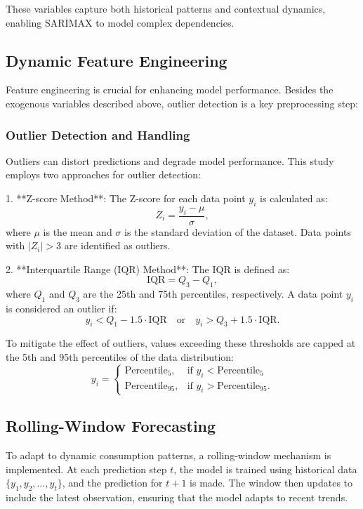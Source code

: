 \documentclass[conference]{IEEEtran}
\begin{document}
These variables capture both historical patterns and contextual dynamics, enabling SARIMAX to model complex dependencies.

\subsection{Dynamic Feature Engineering}

Feature engineering is crucial for enhancing model performance. Besides the exogenous variables described above, outlier detection is a key preprocessing step:

\subsubsection{Outlier Detection and Handling}
Outliers can distort predictions and degrade model performance. This study employs two approaches for outlier detection:

1. **Z-score Method**:
   The Z-score for each data point \( y_i \) is calculated as:
   \begin{equation}
   Z_i = \frac{y_i - \mu}{\sigma},
   \end{equation}
   where \( \mu \) is the mean and \( \sigma \) is the standard deviation of the dataset. Data points with \( |Z_i| > 3 \) are identified as outliers.

2. **Interquartile Range (IQR) Method**:
   The IQR is defined as:
   \begin{equation}
   \text{IQR} = Q_3 - Q_1,
   \end{equation}
   where \( Q_1 \) and \( Q_3 \) are the 25th and 75th percentiles, respectively. A data point \( y_i \) is considered an outlier if:
   \begin{equation}
   y_i < Q_1 - 1.5 \cdot \text{IQR} \quad \text{or} \quad y_i > Q_3 + 1.5 \cdot \text{IQR}.
   \end{equation}

To mitigate the effect of outliers, values exceeding these thresholds are capped at the 5th and 95th percentiles of the data distribution:
\begin{equation}
y_i = 
\begin{cases} 
\text{Percentile}_5, & \text{if } y_i < \text{Percentile}_5 \\
\text{Percentile}_{95}, & \text{if } y_i > \text{Percentile}_{95}.
\end{cases}
\end{equation}

\subsection{Rolling-Window Forecasting}
To adapt to dynamic consumption patterns, a rolling-window mechanism is implemented. At each prediction step \( t \), the model is trained using historical data \( \{y_1, y_2, \dots, y_t\} \), and the prediction for \( t+1 \) is made. The window then updates to include the latest observation, ensuring that the model adapts to recent trends.
\end{document}
